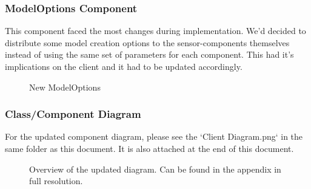 \subsubsection{ModelOptions Component}
This component faced the most changes during implementation. We'd decided to distribute some model creation options to the sensor-components themselves instead of using the same set of parameters for each component. This had it's implications on the client and it had to be updated accordingly.

\begin{figure}[!htbp]
    \centering
    \caption{New ModelOptions}
\end{figure}


\subsubsection{Class/Component Diagram}
For the updated component diagram, please see the `Client Diagram.png` in the same folder as this document. It is also attached at the end of this document.
\begin{figure}[!htbp]
    \centering
    \caption{Overview of the updated diagram. Can be found in the appendix in full resolution.}
\end{figure}